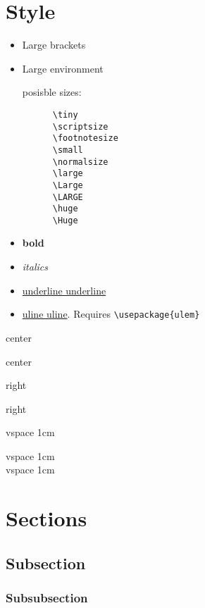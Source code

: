 \documentclass[12pt]{article}
\begin{document}
\section{Style}\label{style}

\begin{itemize}
  
  \item {\Large Large brackets}
  \item \begin{Large}Large environment\end{Large}

    posisble sizes:
    \begin{lstlisting}
      \tiny
      \scriptsize
      \footnotesize
      \small
      \normalsize
      \large
      \Large
      \LARGE
      \huge
      \Huge 
    \end{lstlisting}
  \item \textbf{bold}
  \item \textit{italics}
  \item \underline{underline underline}
  \item \uline{uline uline}. Requires \lstinline|\usepackage{ulem}|
  
\end{itemize}

\begin{center}
  center
  
  center
\end{center}

\begin{flushright}
  right
  
  right
\end{flushright}

vspace 1cm

\vspace{1cm}

vspace 1cm \\[1cm]

vspace 1cm

\section{Sections}\label{secSec}

\subsection{Subsection}\label{secSsec}

\subsubsection{Subsubsection}\label{secSssec}
\end{document}
